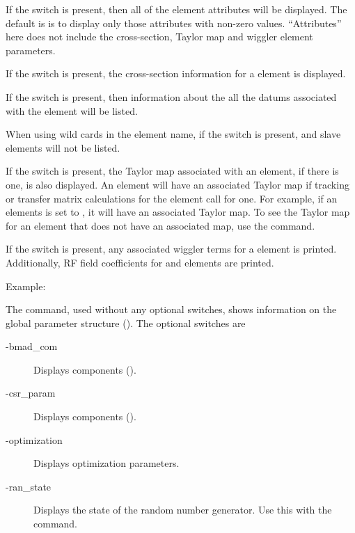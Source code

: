 {{{\begin{description}
If the  switch is present, then all of the element attributes
will be displayed. The default is is to display only those attributes
with non-zero values. ``Attributes'' here does not include the cross-section,
Taylor map and wiggler element parameters.

If the  switch is present, the cross-section
information for a  element is displayed.

If the  switch is present, then information about the 
all the datums associated with the element will be listed. 

When using wild cards in the element name, if the 
switch is present,  and  slave elements
will not be listed.

If the  switch is present, the Taylor map associated with
an element, if there is one, is also displayed. An element will have
an associated Taylor map if tracking or transfer matrix calculations
for the element call for one. For example, if an elements
 is set to , it will have an associated
Taylor map. To see the Taylor map for an element that does not have an
associated map, use the  command.

If the  switch is present, any associated wiggler
terms for a   element is printed. Additionally,
RF field coefficients for  and  elements are printed.

Example:


\item[show global \{-bmad_com\} \{-csr_param\} \{-optimization\} \{-ran_state\} ] \Newline
The  command, used without any optional switches,
shows information on the global parameter structure
(). The optional switches are
  \begin{description}
  \item[-bmad_com] \Newline
Displays  components ().
  \item[-csr_param] \Newline
Displays  components ().
  \item[-optimization] \Newline
Displays optimization parameters.
  \item[-ran_state] \Newline
Displays the state of the random number generator. Use this with the
 command.
  \end{description}


\end{description}}}}
